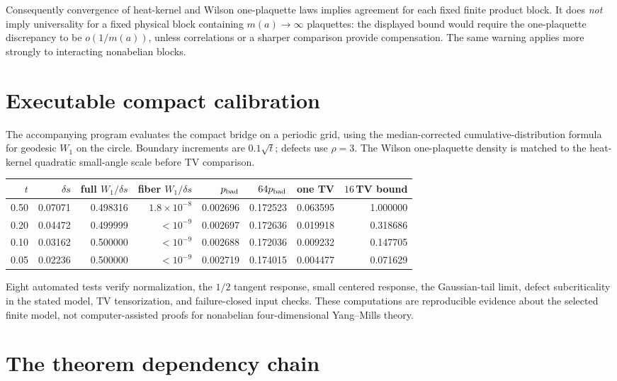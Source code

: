 \documentclass[11pt]{article}
\theoremstyle{remark}
\begin{document}
Consequently convergence of heat-kernel and Wilson one-plaquette laws implies
agreement for each fixed finite product block.  It does \emph{not} imply
universality for a fixed physical block containing $m(a)\to\infty$ plaquettes:
the displayed bound would require the one-plaquette discrepancy to be
$o(1/m(a))$, unless correlations or a sharper comparison provide compensation.
The same warning applies more strongly to interacting nonabelian blocks.

\section{Executable compact calibration}\label{sec:numerics}

The accompanying program evaluates the compact bridge on a periodic grid,
using the median-corrected cumulative-distribution formula for geodesic
$W_1$ on the circle.  Boundary increments are $0.1\sqrt t$; defects use
$\rho=3$.  The Wilson one-plaquette density is matched to the heat-kernel
quadratic small-angle scale before TV comparison.

\begin{center}
\small
\begin{tabular}{@{}rrrrrrrr@{}}
\toprule
$t$ & $\delta s$ & full $W_1/\delta s$ & fiber $W_1/\delta s$
& $p_{\rm bad}$ & $64p_{\rm bad}$ & one TV & $16\,$TV bound\\
\midrule
0.50 & 0.07071 & 0.498316 & $1.8\!\times\!10^{-8}$ & 0.002696 & 0.172523 & 0.063595 & 1.000000\\
0.20 & 0.04472 & 0.499999 & $<10^{-9}$ & 0.002697 & 0.172636 & 0.019918 & 0.318686\\
0.10 & 0.03162 & 0.500000 & $<10^{-9}$ & 0.002688 & 0.172036 & 0.009232 & 0.147705\\
0.05 & 0.02236 & 0.500000 & $<10^{-9}$ & 0.002719 & 0.174015 & 0.004477 & 0.071629\\
\bottomrule
\end{tabular}
\end{center}

Eight automated tests verify normalization, the $1/2$ tangent response, small
centered response, the Gaussian-tail limit, defect subcriticality in the stated
model, TV tensorization, and failure-closed input checks.  These computations
are reproducible evidence about the selected finite model, not computer-assisted
proofs for nonabelian four-dimensional Yang--Mills theory.

\section{The theorem dependency chain}
\end{document}
